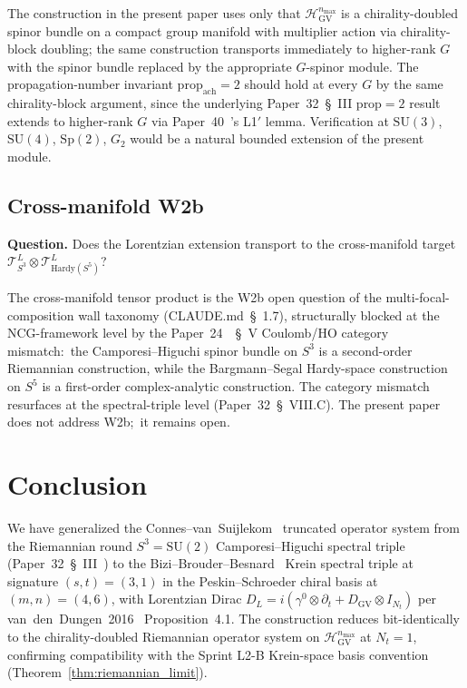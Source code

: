 \documentclass[11pt,a4paper]{article}
\theoremstyle{plain}
\theoremstyle{definition}
\newcommand{\nmax}{n_{\max}}
\newcommand{\Nt}{N_t}
\newcommand{\sthree}{S^{3}}
\newcommand{\Tcal}{\mathcal{T}}
\newcommand{\SU}{\mathrm{SU}}
\newcommand{\DGV}{D_{\mathrm{GV}}}
\newcommand{\DL}{D_L}
\newcommand{\HGV}{\mathcal{H}_{\mathrm{GV}}}
\newcommand{\prop}{\mathrm{prop}}
\newcommand{\achievable}{\mathrm{ach}}
\begin{document}
The construction in the present paper uses only that
$\HGV^{\nmax}$ is a chirality-doubled spinor bundle on a compact
group manifold with multiplier action via chirality-block doubling;
the same construction transports immediately to higher-rank $G$ with
the spinor bundle replaced by the appropriate $G$-spinor module.
The propagation-number invariant
$\prop_\achievable = 2$ should hold at every $G$ by the same
chirality-block argument, since the underlying Paper~32~\S~III
prop$ = 2$ result extends to higher-rank $G$ via
Paper~40~\cite{paper40_unified}'s L1$'$ lemma. Verification at
$\SU(3)$, $\SU(4)$, $\mathrm{Sp}(2)$, $G_2$ would be a natural
bounded extension of the present module.

\subsection{Cross-manifold W2b}\label{sec:open_w2b}

\textbf{Question.} Does the Lorentzian extension transport to the
cross-manifold target $\Tcal_{\sthree}^L \otimes
\Tcal_{\mathrm{Hardy}(S^5)}^L$?

The cross-manifold tensor product is the W2b open question of the
multi-focal-composition wall taxonomy (CLAUDE.md~\S~1.7), structurally
blocked at the NCG-framework level by the Paper~24~\cite{paper24}~\S~V
Coulomb/HO category mismatch:\ the Camporesi--Higuchi spinor bundle
on $\sthree$ is a second-order Riemannian construction, while the
Bargmann--Segal Hardy-space construction on $S^5$ is a first-order
complex-analytic construction. The category mismatch resurfaces at
the spectral-triple level (Paper~32~\S~VIII.C). The present paper
does not address W2b;\ it remains open.

\section{Conclusion}\label{sec:conclusion}

We have generalized the Connes--van~Suijlekom~\cite{connes_vs2021}
truncated operator system from the Riemannian round $\sthree =
\SU(2)$ Camporesi--Higuchi spectral triple~\cite{camporesi_higuchi1996}
(Paper~32~\S~III~\cite{paper32}) to the Bizi--Brouder--Besnard~%
\cite{bizi_brouder_besnard2018} Krein spectral triple at signature
$(s, t) = (3, 1)$ in the Peskin--Schroeder chiral basis at
$(m, n) = (4, 6)$, with Lorentzian Dirac
$\DL = i(\gamma^0 \otimes \partial_t + \DGV \otimes I_{\Nt})$ per
van~den~Dungen~2016~\cite{vandungen2016} Proposition~4.1. The
construction reduces bit-identically to the chirality-doubled
Riemannian operator system on $\HGV^{\nmax}$ at $\Nt = 1$, confirming
compatibility with the Sprint L2-B Krein-space basis convention
(Theorem~\ref{thm:riemannian_limit}).
\end{document}
